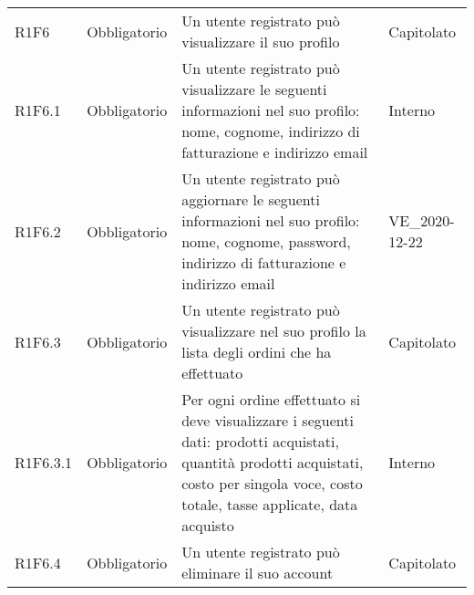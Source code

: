 {\begin{longtable}{C{2.5cm} C{2.8cm} C{6.7cm} C{2.5cm}}

R1F6 & Obbligatorio & Un utente registrato può visualizzare il suo profilo & Capitolato \\
R1F6.1 & Obbligatorio & Un utente registrato può visualizzare le seguenti informazioni nel suo profilo: nome, cognome, indirizzo di fatturazione e indirizzo email & Interno \\
R1F6.2 & Obbligatorio & Un utente registrato può aggiornare le seguenti informazioni nel suo profilo: nome, cognome, password, indirizzo di fatturazione e indirizzo email & VE\_2020-12-22 \\
R1F6.3 & Obbligatorio & Un utente registrato può visualizzare nel suo profilo la lista degli ordini che ha effettuato & Capitolato \\
R1F6.3.1 & Obbligatorio & Per ogni ordine effettuato si deve visualizzare i seguenti dati: prodotti acquistati, quantità prodotti acquistati, costo per singola voce, costo totale, tasse applicate, data acquisto & Interno \\
R1F6.4 & Obbligatorio & Un utente registrato può eliminare il suo account & Capitolato \\



\end{longtable}}
